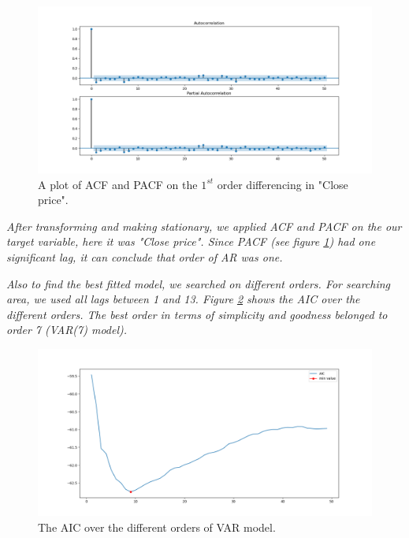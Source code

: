 \begin{figure}[H]
    \centering
    \begin{minipage}[b]{1\textwidth}
        \includegraphics[width=\textwidth]{figures/Ass2/Ass2_Q3_PACF_ACF_1diff.png}
    \end{minipage}
    \caption{A plot of \gls{ACF} and \gls{PACF} on the $1^{st}$ order differencing in "Close price".}
    \label{fig:Ass2_Q4_PACF_ACF_1diff}
\end{figure}

\textit{After transforming and making stationary, we applied 
\gls{ACF} and \gls{PACF} on the our target variable, here it was "Close price". Since PACF (see figure \ref{fig:Ass2_Q4_PACF_ACF_1diff}) had one significant lag, it can conclude that order of AR was one.}

\textit{Also to find the best fitted model, we searched on different orders. For searching area, we used all lags between 1 and 13. Figure \ref{fig:Ass2_Q4_AIC_plot} shows the \gls{AIC} over the different orders. The best order in terms of simplicity and goodness belonged to order 7 (VAR(7) model). }

\begin{figure}[H]
    \centering
    \begin{minipage}[b]{1\textwidth}
        \includegraphics[width=\textwidth]{manuscript/src/figures/Ass2/Ass2_Q4_AIC_plot.png}
    \end{minipage}
    \caption{The \gls{AIC} over the different orders of VAR model.}
    \label{fig:Ass2_Q4_AIC_plot}
\end{figure}

